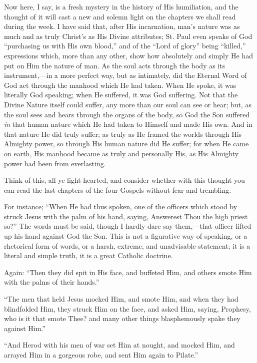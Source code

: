 Now here, I say, is a fresh mystery in the history of His
humiliation, and the thought of it will cast a new and solemn light on
the chapters we shall read during the week. I have said that, after His
incarnation, man's nature was as much and as truly Christ's as His
Divine attributes; St. Paul even speaks of God ``purchasing us with
His own blood,'' and of the ``Lord of glory'' being
``killed,'' expressions which, more than any other, show how
absolutely and simply He had put on Him the nature of man. As the soul
acts through the body as its instrument,—in a more perfect way, but as
intimately, did the Eternal Word of God act through the manhood which He
had taken. When He spoke, it was literally God speaking; when He
suffered, it was God suffering. Not that the Divine Nature itself could
suffer, any more than our soul can see or hear; but, as the soul sees
and hears through the organs of the body, so God the Son suffered \emph{in}
that human nature which He had taken to Himself and made His own. And in
that nature He did truly suffer; as truly as He framed the worlds
through His Almighty power, so through His human nature did He suffer;
for when He came on earth, His manhood became as truly and personally
His, as His Almighty power had been from everlasting.

Think of this, all ye light-hearted, and consider whether with this
thought you can read the last chapters of the four Gospels without fear
and trembling.

For instance; ``When He had thus spoken, one of the officers
which stood by struck Jesus with the palm of his hand, saying, Answerest
Thou the high priest so?'' The words must be said, though I hardly
dare say them,—that officer lifted up his hand against God the Son.
This is not a figurative way of speaking, or a rhetorical form of words,
or a harsh, extreme, and unadvisable statement; it is a literal and
simple truth, it is a great Catholic doctrine.

Again: ``Then they did spit in His face, and buffeted Him, and
others smote Him with the palms of their hands.''

``The men that held Jesus mocked Him, and smote Him, and when
they had blindfolded Him, they struck Him on the face, and asked Him,
saying, Prophesy, who is it that smote Thee? and many other things
blasphemously spake they against Him.''

``And Herod with his men of war set Him at nought, and mocked
Him, and arrayed Him in a gorgeous robe, and sent Him again to
Pilate.''

